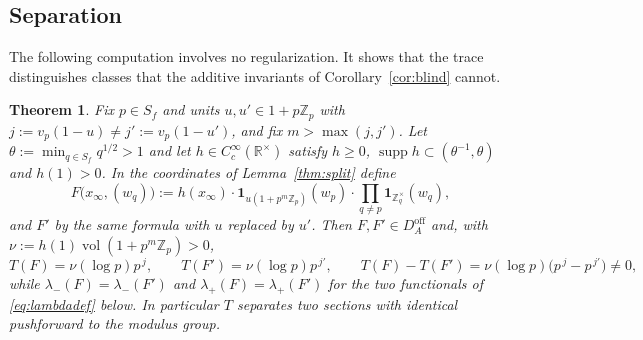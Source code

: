 \documentclass[11pt]{amsart}
\newtheorem{theorem}{Theorem}[section]
\theoremstyle{definition}
\theoremstyle{remark}
\newcommand{\R}{\mathbb R}
\newcommand{\Z}{\mathbb Z}
\newcommand{\supp}{\operatorname{supp}}
\newcommand{\vol}{\operatorname{vol}}
\newcommand{\DA}{D_A}
\begin{document}
\subsection{Separation}

The following computation involves no regularization.  It shows that the
trace distinguishes classes that the additive invariants of
Corollary~\ref{cor:blind} cannot.

\begin{theorem}\label{thm:separate}
Fix $p\in S_f$ and units $u,u'\in1+p\Z_p$ with
$j:=v_p(1-u)\ne j':=v_p(1-u')$, and fix $m>\max(j,j')$.  Let
$\theta:=\min_{q\in S_f}q^{1/2}>1$ and let $h\in C_c^{\infty}(\R^{\times})$
satisfy $h\ge0$, $\supp h\subset(\theta^{-1},\theta)$ and $h(1)>0$.  In the
coordinates of Lemma~\ref{thm:split} define
\begin{equation}\label{eq:sepsections}
F\bigl(x_{\infty},(w_q)\bigr):=h(x_{\infty})\cdot
\mathbf 1_{u(1+p^{m}\Z_p)}(w_p)\cdot\prod_{q\ne p}\mathbf 1_{\Z_q^{\times}}(w_q),
\end{equation}
and $F'$ by the same formula with $u$ replaced by $u'$.  Then $F,F'\in
\DA^{\mathrm{off}}$ and, with $\nu:=h(1)\vol(1+p^{m}\Z_p)>0$,
\begin{equation}\label{eq:sepvalues}
T(F)=\nu(\log p)p^{\,j},\qquad T(F')=\nu(\log p)p^{\,j'},\qquad
T(F)-T(F')=\nu(\log p)\bigl(p^{\,j}-p^{\,j'}\bigr)\neq0,
\end{equation}
while $\lambda_-(F)=\lambda_-(F')$ and $\lambda_+(F)=\lambda_+(F')$ for the two
functionals of \eqref{eq:lambdadef} below.  In particular $T$ separates two
sections with identical pushforward to the modulus group.
\end{theorem}
\end{document}
